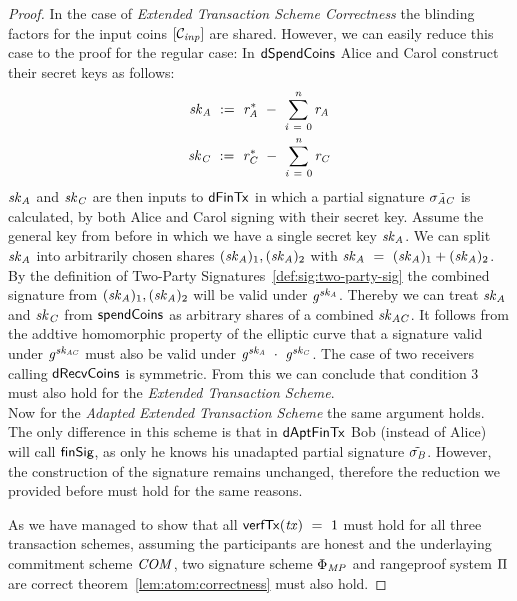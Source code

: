 \begin{proof}
    In the case of \emph{Extended Transaction Scheme Correctness} the blinding factors for the input coins $[\mathcal{C}_{\mathit{inp}}]$ are shared.
    However, we can easily reduce this case to the proof for the regular case:
    In $\mathsf{dSpendCoins}$ Alice and Carol construct their secret keys as follows:
    \begin{gather}
        \mathit{sk}_{\mathit{A}} ~:=~ \mathit{r}_{\mathit{A}}^* ~-~ \sum_{\mathit{i} ~=~ 0}^{\mathit{n}} \mathit{r}_{\mathit{A}} \\
        \mathit{sk}_{\mathit{C}} ~:=~ \mathit{r}_{\mathit{C}}^* ~-~ \sum_{\mathit{i} ~=~ 0}^{\mathit{n}} \mathit{r}_{\mathit{C}}
    \end{gather}
    $\mathit{sk}_{\mathit{A}}$ and $\mathit{sk}_{\mathit{C}}$ are then inputs to $\mathsf{dFinTx}$ in which a partial signature $\tilde{\sigma_{\mathit{A}\mathit{C}}}$ is calculated, by both Alice and Carol signing with their secret key.
    Assume the general key from before in which we have a single secret key $\mathit{sk}_{\mathit{A}}$.
    We can split $\mathit{sk}_{\mathit{A}}$ into arbitrarily chosen shares $(\mathit{sk}_{\mathit{A}})_1, (\mathit{sk}_{\mathit{A}})_2$ with $\mathit{sk}_{\mathit{A}} ~=~ (\mathit{sk}_{\mathit{A}})_1 + (\mathit{sk}_{\mathit{A}})_2$.
    By the definition of Two-Party Signatures~\ref{def:sig:two-party-sig} the combined signature from $(\mathit{sk}_{\mathit{A}})_1, (\mathit{sk}_{\mathit{A}})_2$ will be valid under $\mathit{g}^{\mathit{sk}_{\mathit{A}}}$.
    Thereby we can treat $\mathit{sk}_{\mathit{A}}$ and $\mathit{sk}_{\mathit{C}}$ from $\mathsf{spendCoins}$ as arbitrary shares of a combined $\mathit{sk}_{\mathit{A}\mathit{C}}$.
    It follows from the addtive homomorphic property of the elliptic curve that a signature valid under $\mathit{g}^{\mathit{sk}_{\mathit{A}\mathit{C}}}$ must also be valid under $\mathit{g}^{\mathit{sk}_{\mathit{A}}} ~\cdot~ \mathit{g}^{\mathit{sk}_{\mathit{C}}}$.
    The case of two receivers calling $\mathsf{dRecvCoins}$ is symmetric.
    From this we can conclude that condition 3 must also hold for the \emph{Extended Transaction Scheme}. \\
    Now for the \emph{Adapted Extended Transaction Scheme} the same argument holds.
    The only difference in this scheme is that in $\mathsf{dAptFinTx}$ Bob (instead of Alice) will call $\mathsf{finSig}$, as only he knows his unadapted partial signature $\tilde{\sigma_{\mathit{B}}}$.
    However, the construction of the signature remains unchanged, therefore the reduction we provided before must hold for the same reasons.

    As we have managed to show that all $\mathsf{verfTx}(\mathit{tx}) ~=~ 1$ must hold for all three transaction schemes, assuming the participants are honest and the underlaying commitment scheme $\mathit{COM}$, two signature scheme $\Phi_{\mathit{MP}}$ and rangeproof system $\Pi$ are correct theorem~\ref{lem:atom:correctness} must also hold.
\end{proof}

